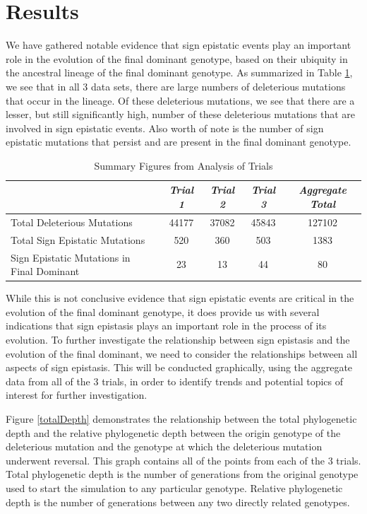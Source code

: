 \documentclass[a4paper, 10pt]{article}
\begin{document}
\section{Results}

We have gathered notable evidence that sign epistatic events play an important role in the evolution of the final dominant genotype, based on their ubiquity in the ancestral lineage of the final dominant genotype. As summarized in Table \ref{sumTable}, we see that in all 3 data sets, there are large numbers of deleterious mutations that occur in the lineage. Of these deleterious mutations, we see that there are a lesser, but still significantly high, number of these deleterious mutations that are involved in sign epistatic events. Also worth of note is the number of sign epistatic mutations that persist and are present in the final dominant genotype. 

\begin{table}[h]
    \centering
\begin{tabular}{| l || c | c | c | c |}
\hline
& {\em Trial 1} & {\em Trial 2} & {\em Trial 3} & {\em Aggregate Total}\\
\hline
Total Deleterious Mutations & 44177 & 37082 & 45843 & 127102\\
Total Sign Epistatic Mutations & 520 & 360 & 503 & 1383\\
Sign Epistatic Mutations in Final Dominant & 23 & 13 & 44 & 80\\
\hline
\end{tabular}
\caption{Summary Figures from Analysis of Trials}
\label{sumTable}
\end{table}

While this is not conclusive evidence that sign epistatic events are critical in the evolution of the final dominant genotype, it does provide us with several indications that sign epistasis plays an important role in the process of its evolution. To further investigate the relationship between sign epistasis and the evolution of the final dominant, we need to consider the relationships between all aspects of sign epistasis. This will be conducted graphically, using the aggregate data from all of the 3 trials, in order to identify trends and potential topics of interest for further investigation.

Figure \ref{totalDepth} demonstrates the relationship between the total phylogenetic depth and the relative phylogenetic depth between the origin genotype of the deleterious mutation and the genotype at which the deleterious mutation underwent reversal. This graph contains all of the points from each of the 3 trials. Total phylogenetic depth is the number of generations from the original genotype used to start the simulation to any particular genotype. Relative phylogenetic depth is the number of generations between any two directly related genotypes. 
\end{document}
